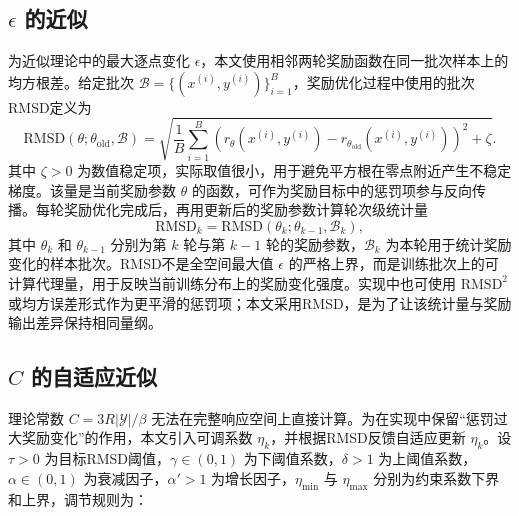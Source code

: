 \subsection{\texorpdfstring{$\epsilon$}{epsilon} 的近似}

为近似理论中的最大逐点变化 $\epsilon$，本文使用相邻两轮奖励函数在同一批次样本上的均方根差。给定批次 $\mathcal{B}=\{(x^{(i)},y^{(i)})\}_{i=1}^{B}$，奖励优化过程中使用的批次RMSD定义为
\begin{equation}
    \mathrm{RMSD}(\theta;\theta_{\mathrm{old}},\mathcal{B})
    =
    \sqrt{
    \frac{1}{B}\sum_{i=1}^{B}
    \left(
    r_\theta(x^{(i)},y^{(i)})
    -
    r_{\theta_{\mathrm{old}}}(x^{(i)},y^{(i)})
    \right)^2
    +\zeta
    }.
    \label{eq:rmsd_function}
\end{equation}
其中 $\zeta>0$ 为数值稳定项，实际取值很小，用于避免平方根在零点附近产生不稳定梯度。该量是当前奖励参数 $\theta$ 的函数，可作为奖励目标中的惩罚项参与反向传播。每轮奖励优化完成后，再用更新后的奖励参数计算轮次级统计量
\begin{equation}
    \mathrm{RMSD}_k
    =
    \mathrm{RMSD}(\theta_k;\theta_{k-1},\mathcal{B}_k),
    \label{eq:rmsd}
\end{equation}
其中 $\theta_k$ 和 $\theta_{k-1}$ 分别为第 $k$ 轮与第 $k-1$ 轮的奖励参数，$\mathcal{B}_k$ 为本轮用于统计奖励变化的样本批次。RMSD不是全空间最大值 $\epsilon$ 的严格上界，而是训练批次上的可计算代理量，用于反映当前训练分布上的奖励变化强度。实现中也可使用 $\mathrm{RMSD}^2$ 或均方误差形式作为更平滑的惩罚项；本文采用RMSD，是为了让该统计量与奖励输出差异保持相同量纲。

\subsection{\texorpdfstring{$C$}{C} 的自适应近似}

理论常数 $C=3R|\mathcal{Y}|/\beta$ 无法在完整响应空间上直接计算。为在实现中保留“惩罚过大奖励变化”的作用，本文引入可调系数 $\eta_k$，并根据RMSD反馈自适应更新 $\eta_k$。设 $\tau>0$ 为目标RMSD阈值，$\gamma\in(0,1)$ 为下阈值系数，$\delta>1$ 为上阈值系数，$\alpha\in(0,1)$ 为衰减因子，$\alpha'>1$ 为增长因子，$\eta_{\min}$ 与 $\eta_{\max}$ 分别为约束系数下界和上界，调节规则为：


